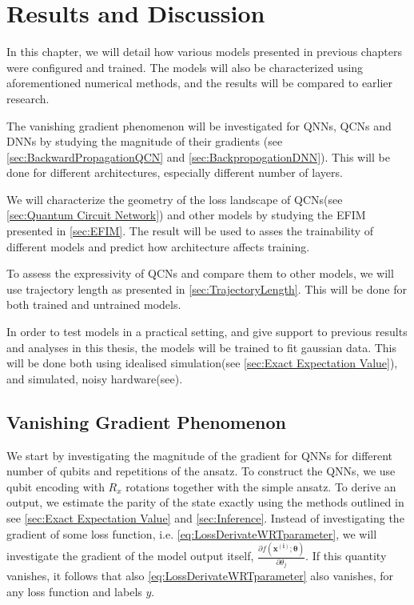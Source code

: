 \chapter{Results and Discussion}\label{chap:results_discussion}
In this chapter, we will detail how various models presented in previous chapters were configured and trained. The models will also be characterized using aforementioned numerical methods, and the results will be compared to earlier research.

The vanishing gradient phenomenon will be investigated for QNNs, QCNs and DNNs by studying the magnitude of their gradients (see \autoref{sec:BackwardPropagationQCN} and \autoref{sec:BackpropogationDNN}). This will be done for different architectures, especially different number of layers.

We will characterize the geometry of the loss landscape of QCNs(see \autoref{sec:Quantum Circuit Network}) and other models by studying the EFIM presented in \autoref{sec:EFIM}. The result will be used to asses the trainability of different models and predict how architecture affects training.

To assess the expressivity of QCNs and compare them to other models, we will use trajectory length as presented in \autoref{sec:TrajectoryLength}. This will be done for both trained and untrained models.

In order to test models in a practical setting, and give support to previous results and analyses in this thesis, the models will be trained to fit gaussian data. This will be done both using idealised simulation(see \autoref{sec:Exact Expectation Value}), and simulated, noisy hardware(see).


\section{Vanishing Gradient Phenomenon}\label{sec:Vanishing Gradient Phenomenon}
We start by investigating the magnitude of the gradient for QNNs for different number of qubits and repetitions of the ansatz. To construct the QNNs, we use qubit encoding with $R_x$ rotations together with the simple ansatz. To derive an output, we estimate the parity of the state exactly using the methods outlined in see \autoref{sec:Exact Expectation Value} and \autoref{sec:Inference}. 
Instead of investigating the gradient of some loss function, i.e. \autoref{eq:LossDerivateWRTparameter}, we will investigate the gradient of the model output itself, $\frac{\partial f(\boldsymbol{x^{(i)}};\boldsymbol{\theta})}{\partial \theta_j}$. If this quantity vanishes, it follows that also \autoref{eq:LossDerivateWRTparameter} also vanishes, for any loss function and labels $y$.

